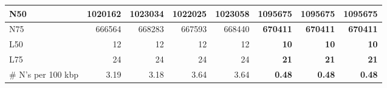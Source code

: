 \documentclass[12pt,a4paper]{article}
\begin{document}
\begin{table}[ht]
\begin{center}
\begin{tabular}{|l*{7}{|r}|}
N50 & 1020162 & 1023034 & 1022025 & 1023058 & {\bf 1095675} & {\bf 1095675} & {\bf 1095675} \\ \hline
N75 & 666564 & 668283 & 667593 & 668440 & {\bf 670411} & {\bf 670411} & {\bf 670411} \\ \hline
L50 & 12 & 12 & 12 & 12 & {\bf 10} & {\bf 10} & {\bf 10} \\ \hline
L75 & 24 & 24 & 24 & 24 & {\bf 21} & {\bf 21} & {\bf 21} \\ \hline
\# N's per 100 kbp & 3.19 & 3.18 & 3.64 & 3.64 & {\bf 0.48} & {\bf 0.48} & {\bf 0.48} \\ \hline
\end{tabular}
\end{center}
\end{table}
\end{document}
